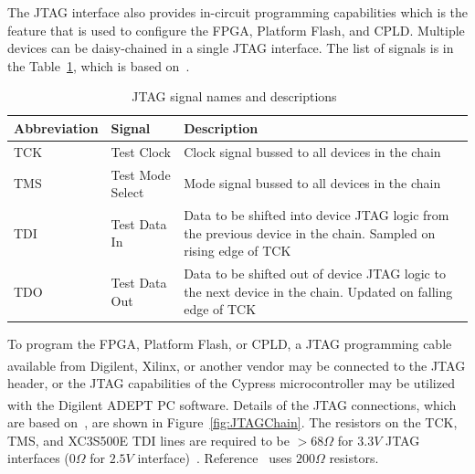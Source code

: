 The JTAG interface also provides in-circuit programming capabilities which is the feature that is used to configure the FPGA, Platform Flash, and CPLD.  Multiple devices can be daisy-chained in a single JTAG interface.  The list of signals is in the Table~\ref{tab:JTAGSigName}, which is based on~\cite{CorelisJTAG}.




%
% 


\renewcommand{\arraystretch}{1.3}
\begin{table}[h]
\centering
\begin{tabular}{|l|l|p{3in}|}
\hline

Abbreviation&

Signal&

Description\\
\hline

TCK&

Test Clock&

Clock signal bussed to all devices in the chain\\
\hline


TMS&

Test Mode Select&

Mode signal bussed to all devices in the chain\\
\hline


TDI&

Test Data In&

Data to be shifted into device JTAG logic from the previous device in the chain.  Sampled on rising edge of TCK\\
\hline


TDO&

Test Data Out&

Data to be shifted out of device JTAG logic to the next device in the chain.  Updated on falling edge of TCK\\
\hline
\end{tabular}
\caption{JTAG signal names and descriptions~\cite{CorelisJTAG}\label{tab:JTAGSigName} }
\end{table}
\renewcommand{\arraystretch}{1.0}

To program the FPGA, Platform Flash, or CPLD, a JTAG programming cable available from Digilent\textsuperscript{\textregistered}, Xilinx\textsuperscript{\textregistered}, or another vendor may be connected to the JTAG header, or the JTAG capabilities of the Cypress microcontroller may be utilized with the Digilent\textsuperscript{\textregistered} ADEPT PC software.  Details of the JTAG connections, which are based on~\cite{DigilentNexys2sch}, are shown in Figure~\ref{fig:JTAGChain}.  The resistors on the TCK, TMS, and XC3S500E TDI lines are required to be $>68\unit{\Omega}$ for $3.3\unit{V}$ JTAG interfaces ($0\unit{\Omega}$ for $2.5\unit{V}$ interface)~\cite{Spartan3ConfigUG}.  Reference~\cite{DigilentNexys2sch} uses $200\unit{\Omega}$ resistors.

